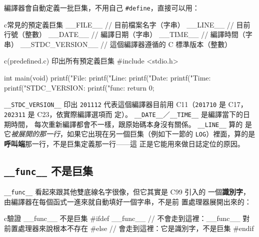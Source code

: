 編譯器會自動定義一批巨集，不用自己 \texttt{\#define}，直接可以用：

\begin{code}{c}{常見的預定義巨集}
__FILE__            // 目前檔案名字（字串）
__LINE__            // 目前行號（整數）
__DATE__            // 編譯日期（字串）
__TIME__            // 編譯時間（字串）
__STDC_VERSION__    // 這個編譯器遵循的 C 標準版本（整數）
\end{code}

\begin{example}{c}{(predefined.c) 印出所有預定義巨集}
#include <stdio.h>

int main(void) {
    printf("File: %
    printf("Line: %
    printf("Date: %
    printf("Time: %
    printf("STDC_VERSION: %
    printf("func: %
    return 0;
}
\end{example}


\texttt{\_\_STDC\_VERSION\_\_} 印出 \texttt{201112} 代表這個編譯器目前用
C11（\texttt{201710} 是 C17，\texttt{202311} 是 C23，依實際編譯選項而
定）。 \texttt{\_\_DATE\_\_}／\texttt{\_\_TIME\_\_} 是編譯當下的日期時間，
每次重新編譯都會不一樣，跟原始碼本身沒有關係。 \texttt{\_\_LINE\_\_} 算的
是它\textit{被展開的那一行}，如果它出現在另一個巨集（例如下一節的
\texttt{LOG}）裡面，算的是\textbf{呼叫端}那一行，不是巨集定義那一行——這
正是它能用來做日誌定位的原因。

\subsection{\texttt{\_\_func\_\_} 不是巨集}

\texttt{\_\_func\_\_} 看起來跟其他雙底線名字很像，但它其實是 C99 引入的
一個\textbf{識別字}，由編譯器在每個函式一進來就自動填好一個字串，不是前
置處理器展開出來的：

\begin{code}{c}{驗證 \_\_func\_\_ 不是巨集}
#ifdef __func__
    // 不會走到這裡：__func__ 對前置處理器來說根本不存在
#else
    // 會走到這裡：它是識別字，不是巨集
#endif
\end{code}

